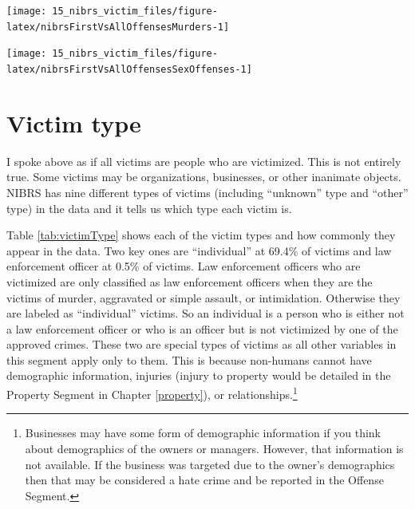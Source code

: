 \documentclass[
]{krantz}
\let\origfigure\figure
\let\endorigfigure\endfigure
\renewenvironment{figure}[1][2] {
    \expandafter\origfigure\expandafter[H]
} {
    \endorigfigure
}
\begin{document}
\begin{figure}

{\centering \texttt{[image: 15\_nibrs\_victim\_files/figure-latex/nibrsFirstVsAllOffensesMurders-1]} 

}

\caption{The numbers of murder victims when considering only the first offense or all offenses, 1991-2022.}\label{fig:nibrsFirstVsAllOffensesMurders}
\end{figure}

\begin{figure}

{\centering \texttt{[image: 15\_nibrs\_victim\_files/figure-latex/nibrsFirstVsAllOffensesSexOffenses-1]} 

}

\caption{The numbers of sexual offense victims when considering only the first offense or all offenses, 1991-2022.}\label{fig:nibrsFirstVsAllOffensesSexOffenses}
\end{figure}

\section{Victim type}\label{victim-type}

I spoke above as if all victims are people who are
victimized. This is not entirely true. Some victims may be
organizations, businesses, or other inanimate objects. NIBRS
has nine different types of victims (including ``unknown''
type and ``other'' type) in the data and it tells us which
type each victim is.

Table \ref{tab:victimType} shows each of the victim types
and how commonly they appear in the data. Two key ones are
``individual'' at 69.4\% of victims and law enforcement
officer at 0.5\% of victims. Law enforcement officers who
are victimized are only classified as law enforcement
officers when they are the victims of murder, aggravated or
simple assault, or intimidation. Otherwise they are labeled
as ``individual'' victims. So an individual is a person who
is either not a law enforcement officer or who is an officer
but is not victimized by one of the approved crimes. These
two are special types of victims as all other variables in
this segment apply only to them. This is because non-humans
cannot have demographic information, injuries (injury to
property would be detailed in the Property Segment in
Chapter \ref{property}), or relationships.\footnote{Businesses
  may have some form of demographic information if you think
  about demographics of the owners or managers. However,
  that information is not available. If the business was
  targeted due to the owner's demographics then that may be
  considered a hate crime and be reported in the Offense
  Segment.}
\end{document}
